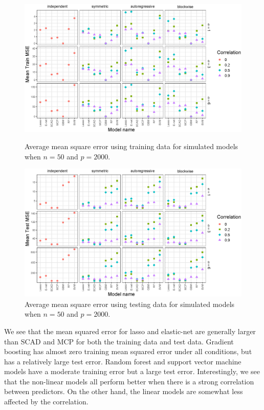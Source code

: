 \documentclass{article}
\begin{document}
\begin{figure}[p!]
	\centering
	\includegraphics[width = \textwidth]{images/facet-train-mse/facet_train_mse_50_2000.eps}
	\captionsetup{width = 0.8\textwidth}
	\caption{Average mean square error using training data for simulated models when $n = 50$ and $p = 2000$.}
	\label{fig:train-mse-50-2000}
	
	\bigskip
	
	\includegraphics[width = \textwidth]{images/facet-test-mse/facet_test_mse_50_2000.eps}
	\captionsetup{width = 0.8\textwidth}
	\caption{Average mean square error using testing data for simulated models when $n = 50$ and $p = 2000$.}
	\label{fig:test-mse-50-2000}
\end{figure}

We see that the mean squared error for lasso and elastic-net are generally larger than SCAD and MCP for both the training data and test data. Gradient boosting has almost zero training mean squared error under all conditions, but has a relatively large test error. Random forest and support vector machine models have a moderate training error but a large test error. Interestingly, we see that the non-linear models all perform better when there is a strong correlation between predictors. On the other hand, the linear models are somewhat less affected by the correlation.
\end{document}
